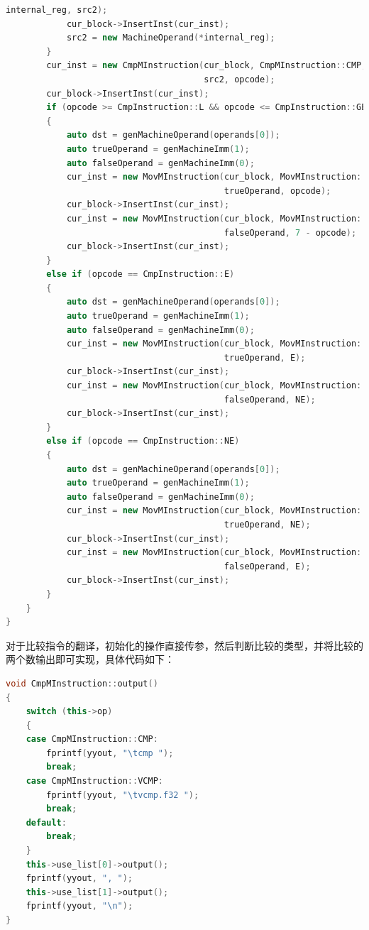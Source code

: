 \documentclass[UTF8,a4paper,10pt]{ctexart}
\begin{document}
\begin{lstlisting}[title = 生成目标代码, language = c++]
                                            internal_reg, src2);
            cur_block->InsertInst(cur_inst);
            src2 = new MachineOperand(*internal_reg);
        }
        cur_inst = new CmpMInstruction(cur_block, CmpMInstruction::CMP, src1,
                                       src2, opcode);
        cur_block->InsertInst(cur_inst);
        if (opcode >= CmpInstruction::L && opcode <= CmpInstruction::GE)
        {
            auto dst = genMachineOperand(operands[0]);
            auto trueOperand = genMachineImm(1);
            auto falseOperand = genMachineImm(0);
            cur_inst = new MovMInstruction(cur_block, MovMInstruction::MOV, dst,
                                           trueOperand, opcode);
            cur_block->InsertInst(cur_inst);
            cur_inst = new MovMInstruction(cur_block, MovMInstruction::MOV, dst,
                                           falseOperand, 7 - opcode);
            cur_block->InsertInst(cur_inst);
        }
        else if (opcode == CmpInstruction::E)
        {
            auto dst = genMachineOperand(operands[0]);
            auto trueOperand = genMachineImm(1);
            auto falseOperand = genMachineImm(0);
            cur_inst = new MovMInstruction(cur_block, MovMInstruction::MOV, dst,
                                           trueOperand, E);
            cur_block->InsertInst(cur_inst);
            cur_inst = new MovMInstruction(cur_block, MovMInstruction::MOV, dst,
                                           falseOperand, NE);
            cur_block->InsertInst(cur_inst);
        }
        else if (opcode == CmpInstruction::NE)
        {
            auto dst = genMachineOperand(operands[0]);
            auto trueOperand = genMachineImm(1);
            auto falseOperand = genMachineImm(0);
            cur_inst = new MovMInstruction(cur_block, MovMInstruction::MOV, dst,
                                           trueOperand, NE);
            cur_block->InsertInst(cur_inst);
            cur_inst = new MovMInstruction(cur_block, MovMInstruction::MOV, dst,
                                           falseOperand, E);
            cur_block->InsertInst(cur_inst);
        }
    }
}
\end{lstlisting}
对于比较指令的翻译，初始化的操作直接传参，然后判断比较的类型，并将比较的两个数输出即可实现，具体代码如下：

\begin{lstlisting}[title = 机器码翻译, language = c++]
void CmpMInstruction::output()
{
    switch (this->op)
    {
    case CmpMInstruction::CMP:
        fprintf(yyout, "\tcmp ");
        break;
    case CmpMInstruction::VCMP:
        fprintf(yyout, "\tvcmp.f32 ");
        break;
    default:
        break;
    }
    this->use_list[0]->output();
    fprintf(yyout, ", ");
    this->use_list[1]->output();
    fprintf(yyout, "\n");
}
\end{lstlisting}
\end{document}
